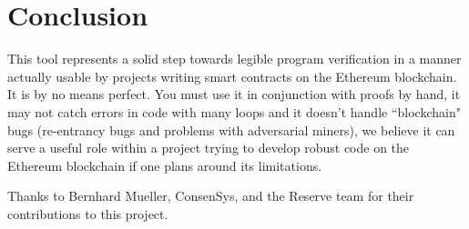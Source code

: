 \documentclass[acmsmall]{acmart}\settopmatter{}
\begin{document}
\section{Conclusion}

This tool represents a solid step towards legible program verification in a manner actually usable by projects writing smart contracts on the Ethereum blockchain. It is by no means perfect. You must use it in conjunction with proofs by hand, it may not catch errors in code with many loops and it doesn't handle ``blockchain" bugs (re-entrancy bugs and problems with adversarial miners), we believe it can serve a useful role within a project trying to develop robust code on the Ethereum blockchain if one plans around its limitations.

Thanks to Bernhard Mueller, ConsenSys, and the Reserve team for their contributions to this project.


\end{document}
